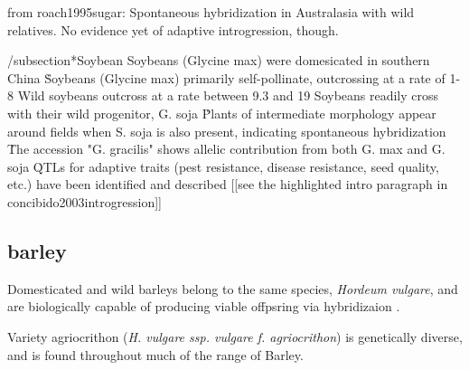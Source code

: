 \documentclass[11pt]{article}
\begin{document}
 from roach1995sugar:
 Spontaneous hybridization in Australasia with wild relatives.
 No evidence yet of adaptive introgression, though.






/subsection*{Soybean}
Soybeans (Glycine max) were domesicated in southern China \cite{guo2010single}\.
Soybeans (Glycine max) primarily self-pollinate, outcrossing at a rate of 1-8%
Wild soybeans outcross at a rate between 9.3 and 19%
Soybeans readily cross with their wild progenitor, G. soja \cite{singh1988genomic}\.
Plants of intermediate morphology appear around fields when S. soja is also present, indicating spontaneous hybridization \cite{kwon1972studies}\.
The accession "G. gracilis" shows allelic contribution from both G. max and G. soja \cite{keim1989restriction}\.
QTLs for adaptive traits (pest resistance, disease resistance, seed quality, etc.) have been identified and described [[see the highlighted intro paragraph in concibido2003introgression]]






\subsection*{barley}

Domesticated and wild barleys belong to the same species, \emph{Hordeum vulgare}, and are biologically capable of producing viable offpsring via hybridizaion \cite{von1995ecographical}.

Variety agriocrithon (\emph{H. vulgare ssp. vulgare f. agriocrithon}) is genetically diverse, and is found throughout much of the range of Barley.
\end{document}
